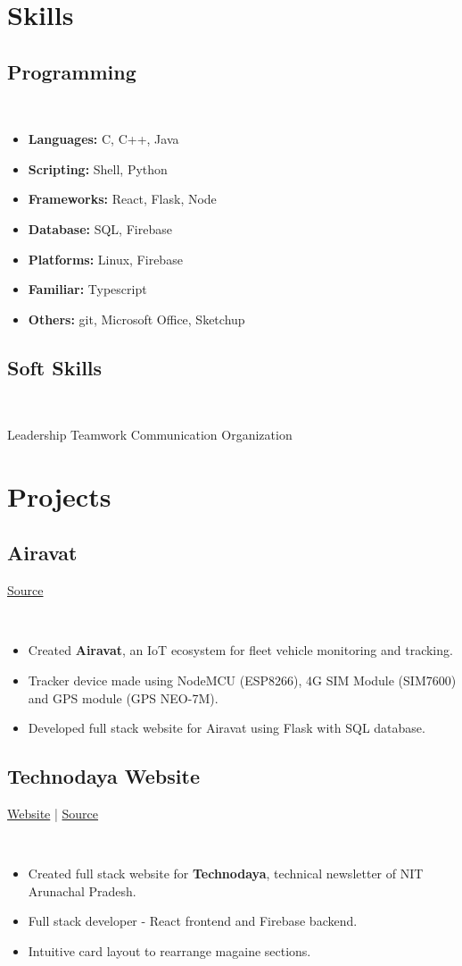 \documentclass[]{article}
\newcommand{\subheading}[2]{
  {\subsection{#1}
  \hfill{#2}}\\
  \vspace{2pt}
}
\newenvironment{tightemize}{
\vspace{-\topsep}\begin{itemize}\itemsep1pt \parskip0pt \parsep0pt}
{\end{itemize}\vspace{-\topsep}}
\begin{document}
    \section{Skills}
    \subheading{Programming}{}
    \begin{tightemize}
      \item \textbf{Languages:} C, C++, Java
      \item \textbf{Scripting:} Shell, Python
      \item \textbf{Frameworks:} React, Flask, Node
      \item \textbf{Database:} SQL, Firebase
      \item \textbf{Platforms:} Linux, Firebase
      \item \textbf{Familiar:} Typescript
      \item \textbf{Others:} git, Microsoft Office, Sketchup
    \end{tightemize}

    \subheading{Soft Skills}{}
    Leadership \textbullet{} Teamwork \textbullet{} Communication \textbullet{} Organization

    \section{Projects}
    \subheading{Airavat}{\href{https://github.com/tripathics/airavat}{Source}}
    \begin{tightemize}
      \item Created \textbf{Airavat}, an IoT ecosystem for fleet vehicle monitoring and tracking.
      \item Tracker device made using NodeMCU (ESP8266), 4G SIM Module (SIM7600) and GPS module (GPS NEO-7M).
      \item Developed full stack website for Airavat using Flask with SQL database.
    \end{tightemize}

    \subheading{Technodaya Website}{
      \href{https://technodaya.netlify.app}{Website} | 
      \href{https://github.com/PursottamSah6003}{Source}
    }
    \begin{tightemize}
      \item Created full stack website for \textbf{Technodaya}, technical newsletter of NIT Arunachal Pradesh.
      \item Full stack developer - React frontend and Firebase backend.
      \item Intuitive card layout to rearrange magaine sections. 
    \end{tightemize}
\end{document}
